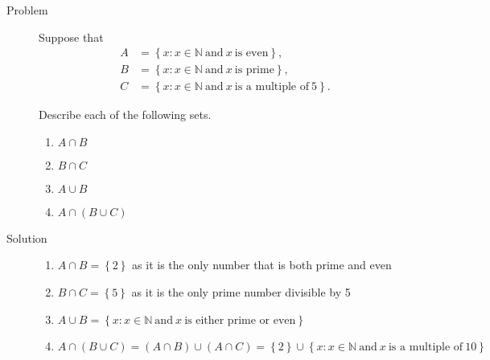 \begin{description}
\item[Problem]
Suppose that
\begin{equation*}
\begin{aligned}
A &= \left\{ x : x \in \mathbb{N}\ \text{and}\ x\ \text{is even}  \right\},\\
B &= \left\{ x : x \in \mathbb{N}\ \text{and}\ x\ \text{is prime} \right\},\\
C &= \left\{ x : x \in \mathbb{N}\ \text{and}\ x\ \text{is a multiple of}\ 5
  \right\}.
\end{aligned}
\end{equation*}

Describe each of the following sets.

\begin{multicols}{2}
\begin{enumerate}
\item $A \cap B$
\item $B \cap C$
\item $A \cup B$
\item $A \cap \left(B \cup C\right)$
\end{enumerate}
\end{multicols}

\item[Solution]

\begin{enumerate}
\item $A \cap B = \left\{2\right\}$ as it is the only number that is both prime
and even
\item $B \cap C = \left\{5\right\}$ as it is the only prime number divisible by
5
\item $A \cup B = \left\{ x : x \in \mathbb{N}\ \text{and}\ x\ \text{is either
prime or even} \right\}$
\item $A \cap \left(B \cup C\right) = \left(A \cap B\right) \cup
\left(A \cap C\right) = \left\{2\right\} \cup \left\{ x : x \in \mathbb{N}\ 
\text{and}\ x\ \text{is a multiple of}\ 10 \right\}$
\end{enumerate}

\end{description}
